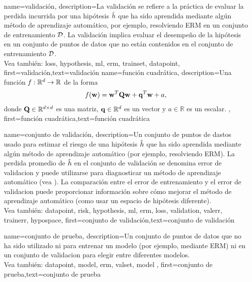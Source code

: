 {
	name={validación},
	description={La validación se refiere a la práctica de evaluar la perdida incurrida por una 
		hipótesis $\hat{h}$ que ha sido aprendida mediante algún método de aprendizaje automático, 
		por ejemplo, resolviendo ERM en un conjunto de entrenamiento $\mathcal{D}$. La validación implica evaluar 
		el desempeño de la hipótesis en un conjunto de puntos de datos que no están contenidos 
		en el conjunto de entrenamiento $\mathcal{D}$.
		\\
	 Vea también: \gls{loss}, \gls{hypothesis}, \gls{ml}, \gls{erm}, \gls{trainset}, \gls{datapoint}}, 
	first={validación},text={validación}  
}
{name={función cuadrática},
	description={Una función $f: \mathbb{R}^{d} \rightarrow \mathbb{R}$ de la forma
	$$f({\bf w}) =  {\bf w}^{T} \mathbf{Q} \mathbf{w} + \mathbf{q}^{T} {\bf w}+a,$$ donde 
	$\mathbf{Q} \in \mathbb{R}^{d \times d}$ es una matriz, ${\bf q} \in \mathbb{R}^{d}$ es un vector
	y $a \in \mathbb{R}$ es un escalar. 
	},
	first={función cuadrática},text={función cuadrática}  
}

{name={conjunto de validación},
  description={Un conjunto de puntos de dastos usado para 
  	estimar el riesgo de una hipótesis $\hat{h}$ que ha sido 
  	aprendida mediante algún método de aprendizaje automático (por ejemplo, resolviendo ERM). La perdida promedio de $\hat{h}$ 
  	en el conjunto de validación se denomina error de validacion y puede utilizarse para diagnosticar un método de 
  	aprendizaje automático (vea \cite[Sec. 6.6]{MLBasics}). La comparación entre el error de entrenamiento 
  	y el error de validacion puede proporcionar información sobre cómo mejorar el método de aprendizaje automático  (como usar 
  	un espacio de hipótesis diferente).
	  \\
	  Vea también: \gls{datapoint}, \gls{risk}, \gls{hypothesis}, \gls{ml}, \gls{erm}, \gls{loss}, \gls{validation},  \gls{valerr}, \gls{trainerr}, \gls{hypospace}},
	first={conjunto de validación},text={conjunto de validación}  
}

{
	name={conjunto de prueba},
	description={Un conjunto de puntos de datos que no ha sido 
		utilizado ni para entrenar un modelo (por ejemplo, mediante ERM) ni en un 
		conjunto de validacion para elegir entre diferentes modelos.
		\\
		Vea también: \gls{datapoint}, \gls{model}, \gls{erm}, \gls{valset}, \gls{model} }, 
	first={conjunto de prueba},text={conjunto de prueba}  
}



